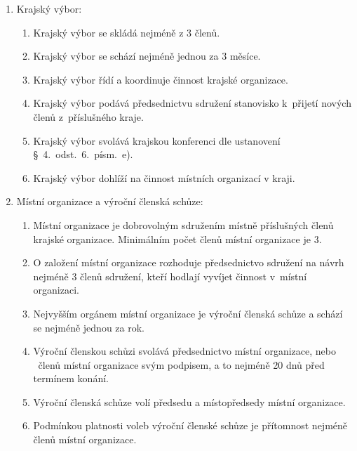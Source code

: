 \documentclass[a4paper]{article}
\begin{document}
\begin{enumerate}
    \item Krajský výbor:
        \begin{enumerate}
        \item Krajský výbor se skládá nejméně z 3 členů.

        \item Krajský výbor se schází nejméně jednou za 3 měsíce.

        \item Krajský výbor řídí a koordinuje činnost krajské organizace.

        \item Krajský výbor podává předsednictvu sdružení stanovisko k~přijetí
            nových členů z~příslušného kraje.

        \item Krajský výbor svolává krajskou konferenci dle ustanovení
            \S~4.~odst.~6.~písm.~e).

        \item Krajský výbor dohlíží na činnost místních organizací v kraji.
        \end{enumerate}

    \item Místní organizace a výroční členská schůze:
        \begin{enumerate}
        \item Místní organizace je dobrovolným sdružením místně příslušných
            členů krajské organizace. Minimálním počet členů místní organizace
            je 3.

        \item O založení místní organizace rozhoduje předsednictvo sdružení na
            návrh nejméně 3 členů sdružení, kteří hodlají vyvíjet činnost
            v~místní organizaci.

        \item Nejvyšším orgánem místní organizace je výroční členská schůze a
            schází se nejméně jednou za rok.

        \item Výroční členskou schůzi svolává předsednictvo místní organizace,
            nebo ~členů místní organizace svým podpisem, a to
            nejméně 20 dnů před termínem konání.

        \item Výroční členská schůze volí předsedu a místopředsedy místní
            organizace.

        \item Podmínkou platnosti voleb výroční členské schůze
            je přítomnost nejméně  členů místní organizace.
        \end{enumerate}


\end{enumerate}
\end{document}

